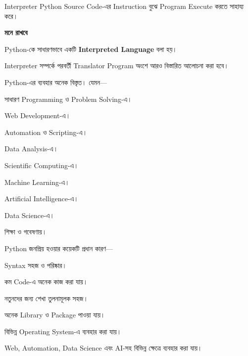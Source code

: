 Interpreter Python Source Code-এর Instruction বুঝে Program
Execute করতে সাহায্য করে।

\begin{rememberbox}

\textbf{\color{deepOrange}মনে রাখবে}

Python-কে সাধারণভাবে একটি
\textbf{Interpreted Language} বলা হয়।

Interpreter সম্পর্কে পরবর্তী Translator Program অংশে আরও
বিস্তারিত আলোচনা করা হবে।

\end{rememberbox}


Python-এর ব্যবহার অনেক বিস্তৃত। যেমন—

\begin{compacttwocolpoints}

\item সাধারণ Programming ও Problem Solving-এ।

\item Web Development-এ।

\item Automation ও Scripting-এ।

\item Data Analysis-এ।

\item Scientific Computing-এ।

\item Machine Learning-এ।

\item Artificial Intelligence-এ।

\item Data Science-এ।

\item শিক্ষা ও গবেষণায়।

\end{compacttwocolpoints}


Python জনপ্রিয় হওয়ার কয়েকটি প্রধান কারণ—

\begin{compacttwocolpoints}

\item Syntax সহজ ও পরিষ্কার।

\item কম Code-এ অনেক কাজ করা যায়।

\item নতুনদের জন্য শেখা তুলনামূলক সহজ।

\item অনেক Library ও Package পাওয়া যায়।

\item বিভিন্ন Operating System-এ ব্যবহার করা যায়।

\item Web, Automation, Data Science এবং AI-সহ বিভিন্ন ক্ষেত্রে
ব্যবহার করা যায়।

\end{compacttwocolpoints}

